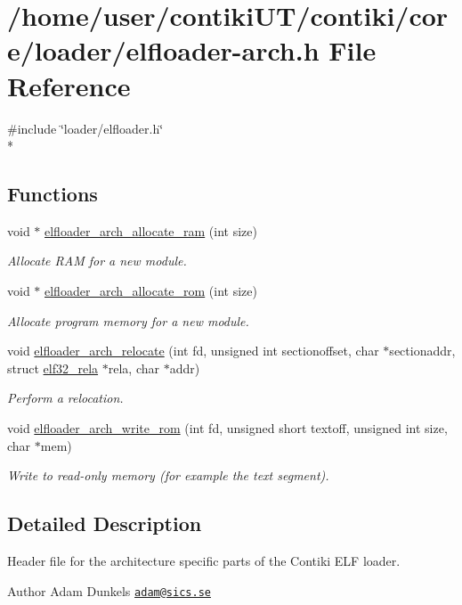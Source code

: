 \hypertarget{elfloader-arch_8h}{}\section{/home/user/contiki\+U\+T/contiki/core/loader/elfloader-\/arch.h File Reference}
\label{elfloader-arch_8h}
{\ttfamily \#include \char`\"{}loader/elfloader.\+h\char`\"{}}\\*
\subsection*{Functions}
\begin{DoxyCompactItemize}
\item 
void $\ast$ \hyperlink{group__elfloaderarch_ga1583b48c655f508d845d1a22bd54d2a3}{elfloader\+\_\+arch\+\_\+allocate\+\_\+ram} (int size)
\begin{DoxyCompactList}\small\item\em Allocate R\+A\+M for a new module. \end{DoxyCompactList}\item 
void $\ast$ \hyperlink{group__elfloaderarch_gabf03ff0788cfecc08e82ec0fc3bff6f7}{elfloader\+\_\+arch\+\_\+allocate\+\_\+rom} (int size)
\begin{DoxyCompactList}\small\item\em Allocate program memory for a new module. \end{DoxyCompactList}\item 
void \hyperlink{group__elfloaderarch_gab20475a2c29caa2906b860368895944b}{elfloader\+\_\+arch\+\_\+relocate} (int fd, unsigned int sectionoffset, char $\ast$sectionaddr, struct \hyperlink{structelf32__rela}{elf32\+\_\+rela} $\ast$rela, char $\ast$addr)
\begin{DoxyCompactList}\small\item\em Perform a relocation. \end{DoxyCompactList}\item 
void \hyperlink{group__elfloaderarch_ga83a40c77924d5791d8ec67f3465a99de}{elfloader\+\_\+arch\+\_\+write\+\_\+rom} (int fd, unsigned short textoff, unsigned int size, char $\ast$mem)
\begin{DoxyCompactList}\small\item\em Write to read-\/only memory (for example the text segment). \end{DoxyCompactList}\end{DoxyCompactItemize}


\subsection{Detailed Description}
Header file for the architecture specific parts of the Contiki E\+L\+F loader.

\begin{DoxyAuthor}{Author}
Adam Dunkels \href{mailto:adam@sics.se}{\tt adam@sics.\+se} 
\end{DoxyAuthor}
